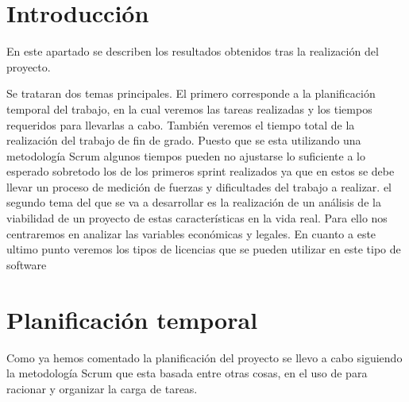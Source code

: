 
\section{Introducción}

En este apartado se describen los resultados obtenidos tras la realización del proyecto. 

Se trataran dos temas principales. El primero corresponde a la planificación temporal del trabajo, en la cual veremos las tareas realizadas y los tiempos requeridos para llevarlas a cabo. También veremos el tiempo total de la realización del trabajo de fin de grado. Puesto que se esta utilizando una metodología Scrum algunos tiempos pueden no ajustarse lo suficiente a lo esperado sobretodo los de los primeros sprint realizados ya que en estos se debe llevar un proceso de medición de fuerzas y dificultades del trabajo a realizar. 
el segundo tema del que se va a desarrollar es la realización de un análisis de la viabilidad de un proyecto de estas características en la vida real. Para ello nos centraremos en analizar las variables económicas y legales. En cuanto a este ultimo punto veremos los tipos de licencias que se pueden utilizar en este tipo de software


\section{Planificación temporal}

Como ya hemos comentado la planificación del proyecto se llevo a cabo siguiendo la metodología Scrum que esta basada entre otras cosas, en el uso de  para racionar y organizar la carga de tareas. 

